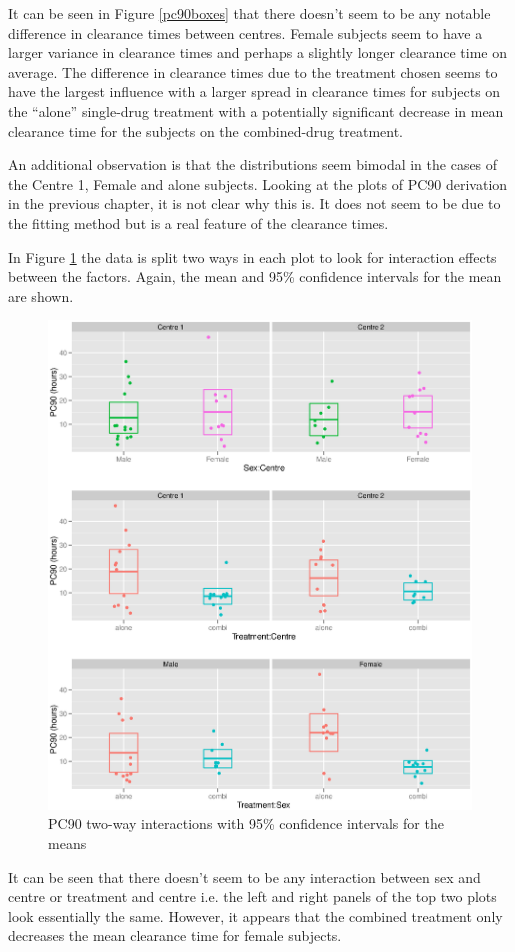 It can be seen in Figure \ref{pc90boxes} that there doesn't seem to be any notable difference in clearance times between centres. Female subjects seem to have a larger variance in clearance times and perhaps a slightly longer clearance time on average. The difference in clearance times due to the treatment chosen seems to have the largest influence with a larger spread in clearance times for subjects on the ``alone'' single-drug treatment with a potentially significant decrease in mean clearance time for the subjects on the combined-drug treatment.

An additional observation is that the distributions seem bimodal in the cases of the Centre 1, Female and alone subjects. Looking at the plots of PC90 derivation in the previous chapter, it is not clear why this is. It does not seem to be due to the fitting method but is a real feature of the clearance times.

In Figure \ref{pc90interaction} the data is split two ways in each plot to look for interaction effects between the factors. Again, the mean and 95\% confidence intervals for the mean are shown.
\begin{figure}[p]
\includegraphics[width=6.5in]{pc90interaction.eps} 
\caption{PC90 two-way interactions with 95\% confidence intervals for the means}
\label{pc90interaction}
\end{figure}
It can be seen that there doesn't seem to be any interaction between sex and centre or treatment and centre i.e. the left and right panels of the top two plots look essentially the same. However, it appears that the combined treatment only decreases the mean clearance time for female subjects.
